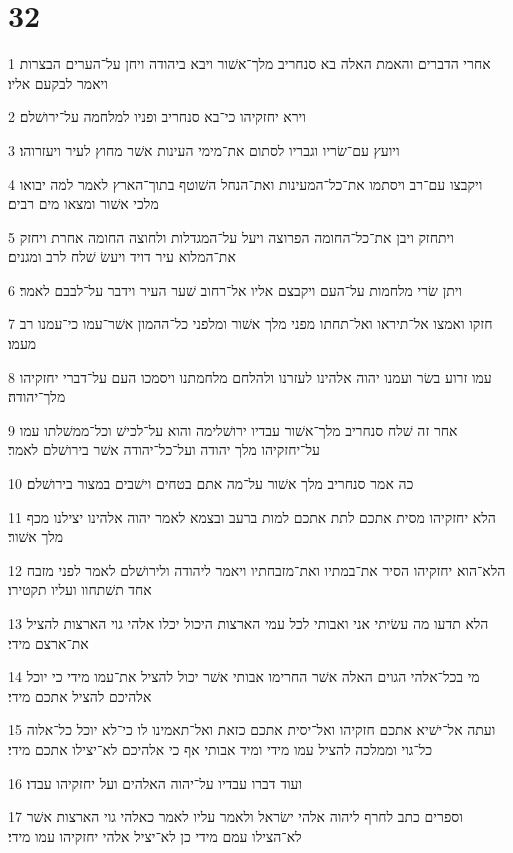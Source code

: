 \chapter{32}

\par 1 אחרי הדברים והאמת האלה בא סנחריב מלך־אשׁור ויבא ביהודה ויחן על־הערים הבצרות ויאמר לבקעם אליו׃
\par 2 וירא יחזקיהו כי־בא סנחריב ופניו למלחמה על־ירושׁלם׃
\par 3 ויועץ עם־שׂריו וגבריו לסתום את־מימי העינות אשׁר מחוץ לעיר ויעזרוהו׃
\par 4 ויקבצו עם־רב ויסתמו את־כל־המעינות ואת־הנחל השׁוטף בתוך־הארץ לאמר למה יבואו מלכי אשׁור ומצאו מים רבים׃
\par 5 ויתחזק ויבן את־כל־החומה הפרוצה ויעל על־המגדלות ולחוצה החומה אחרת ויחזק את־המלוא עיר דויד ויעשׂ שׁלח לרב ומגנים׃
\par 6 ויתן שׂרי מלחמות על־העם ויקבצם אליו אל־רחוב שׁער העיר וידבר על־לבבם לאמר׃
\par 7 חזקו ואמצו אל־תיראו ואל־תחתו מפני מלך אשׁור ומלפני כל־ההמון אשׁר־עמו כי־עמנו רב מעמו׃
\par 8 עמו זרוע בשׂר ועמנו יהוה אלהינו לעזרנו ולהלחם מלחמתנו ויסמכו העם על־דברי יחזקיהו מלך־יהודה׃
\par 9 אחר זה שׁלח סנחריב מלך־אשׁור עבדיו ירושׁלימה והוא על־לכישׁ וכל־ממשׁלתו עמו על־יחזקיהו מלך יהודה ועל־כל־יהודה אשׁר בירושׁלם לאמר׃
\par 10 כה אמר סנחריב מלך אשׁור על־מה אתם בטחים וישׁבים במצור בירושׁלם׃
\par 11 הלא יחזקיהו מסית אתכם לתת אתכם למות ברעב ובצמא לאמר יהוה אלהינו יצילנו מכף מלך אשׁור׃
\par 12 הלא־הוא יחזקיהו הסיר את־במתיו ואת־מזבחתיו ויאמר ליהודה ולירושׁלם לאמר לפני מזבח אחד תשׁתחוו ועליו תקטירו׃
\par 13 הלא תדעו מה עשׂיתי אני ואבותי לכל עמי הארצות היכול יכלו אלהי גוי הארצות להציל את־ארצם מידי׃
\par 14 מי בכל־אלהי הגוים האלה אשׁר החרימו אבותי אשׁר יכול להציל את־עמו מידי כי יוכל אלהיכם להציל אתכם מידי׃
\par 15 ועתה אל־ישׁיא אתכם חזקיהו ואל־יסית אתכם כזאת ואל־תאמינו לו כי־לא יוכל כל־אלוה כל־גוי וממלכה להציל עמו מידי ומיד אבותי אף כי אלהיכם לא־יצילו אתכם מידי׃
\par 16 ועוד דברו עבדיו על־יהוה האלהים ועל יחזקיהו עבדו׃
\par 17 וספרים כתב לחרף ליהוה אלהי ישׂראל ולאמר עליו לאמר כאלהי גוי הארצות אשׁר לא־הצילו עמם מידי כן לא־יציל אלהי יחזקיהו עמו מידי׃
